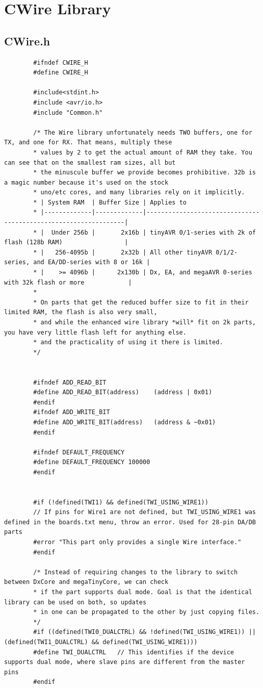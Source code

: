\documentclass[11pt,a4paper,titlepage]{report}
\begin{document}
	\section{CWire Library}\label{appendix:cwire_library_code}
	\subsection{CWire.h}\label{appendix:cwire_h}
	\begin{lstlisting}
		#ifndef CWIRE_H
		#define	CWIRE_H
		
		#include<stdint.h>
		#include <avr/io.h>
		#include "Common.h"
		
		/* The Wire library unfortunately needs TWO buffers, one for TX, and one for RX. That means, multiply these
		* values by 2 to get the actual amount of RAM they take. You can see that on the smallest ram sizes, all but
		* the minuscule buffer we provide becomes prohibitive. 32b is a magic number because it's used on the stock
		* uno/etc cores, and many libraries rely on it implicitly.
		* | System RAM  | Buffer Size | Applies to
		* |-------------|-------------|----------------------------------------------------------------|
		* |  Under 256b |       2x16b | tinyAVR 0/1-series with 2k of flash (128b RAM)                 |
		* |   256-4095b |       2x32b | All other tinyAVR 0/1/2-series, and EA/DD-series with 8 or 16k |
		* |    >= 4096b |      2x130b | Dx, EA, and megaAVR 0-series with 32k flash or more            |
		*
		* On parts that get the reduced buffer size to fit in their limited RAM, the flash is also very small,
		* and while the enhanced wire library *will* fit on 2k parts, you have very little flash left for anything else.
		* and the practicality of using it there is limited.
		*/
		
		
		#ifndef ADD_READ_BIT
		#define ADD_READ_BIT(address)    (address | 0x01)
		#endif
		#ifndef ADD_WRITE_BIT
		#define ADD_WRITE_BIT(address)   (address & ~0x01)
		#endif
		
		#ifndef DEFAULT_FREQUENCY
		#define DEFAULT_FREQUENCY 100000
		#endif
		
		
		#if (!defined(TWI1) && defined(TWI_USING_WIRE1))
		// If pins for Wire1 are not defined, but TWI_USING_WIRE1 was defined in the boards.txt menu, throw an error. Used for 28-pin DA/DB parts
		#error "This part only provides a single Wire interface."
		#endif
		
		/* Instead of requiring changes to the library to switch between DxCore and megaTinyCore, we can check
		* if the part supports dual mode. Goal is that the identical library can be used on both, so updates
		* in one can be propagated to the other by just copying files.
		*/
		#if ((defined(TWI0_DUALCTRL) && !defined(TWI_USING_WIRE1)) || (defined(TWI1_DUALCTRL) && defined(TWI_USING_WIRE1)))
		#define TWI_DUALCTRL   // This identifies if the device supports dual mode, where slave pins are different from the master pins
		#endif
		

\end{lstlisting}
\end{document}
